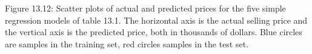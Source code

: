 
Figure 13.12: Scatter plots of actual and predicted prices for the five simple regression models of table 13.1. The horizontal axis is the actual selling price and the vertical axis is the predicted price, both in thousands of dollars. Blue circles are samples in the training set, red circles samples in the test set.

 